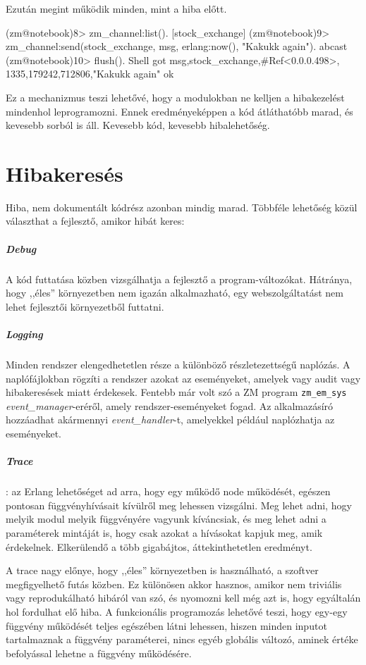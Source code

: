 \documentclass[12pt, a4paper, oneside]{book}
\begin{document}
Ezután megint működik minden, mint a hiba előtt.

\begin{code}{}{}
(zm@notebook)8> zm_channel:list().                                               
[stock_exchange]
(zm@notebook)9> zm_channel:send(stock_exchange, 
                    {msg, {erlang:now(), "Kakukk again"}}).
abcast
(zm@notebook)10> flush().                                                               
Shell got {msg,{stock_exchange,#Ref<0.0.0.498>},
               {{1335,179242,712806},"Kakukk again"}}
ok
\end{code}

Ez a mechanizmus teszi lehetővé, hogy a modulokban ne kelljen a
hibakezelést mindenhol leprogramozni. Ennek eredményeképpen a kód átláthatóbb
marad, és kevesebb sorból is áll. Kevesebb kód, kevesebb hibalehetőség. 

\section{Hibakeresés}
Hiba, nem dokumentált kódrész azonban mindig marad. Többféle lehetőség közül
választhat a fejlesztő, amikor hibát keres: 
\subparagraph{Debug} A kód futtatása közben vizsgálhatja a fejlesztő a
program-változókat. Hátránya, hogy ,,éles'' környezetben nem igazán
alkalmazható, egy webszolgáltatást nem lehet fejlesztői környezetből futtatni.
\subparagraph{Logging} Minden rendszer elengedhetetlen része a különböző
részletezettségű naplózás. A naplófájlokban rögzíti a rendszer azokat az
eseményeket, amelyek vagy audit vagy hibakeresések miatt érdekesek. Fentebb már
volt szó a ZM program \texttt{zm\_em\_sys} \emph{event\_manager}-eréről, amely
rendszer-eseményeket fogad. Az alkalmazásíró hozzáadhat akármennyi
\emph{event\_handler}-t, amelyekkel például naplózhatja az eseményeket.
\subparagraph{Trace}: az Erlang lehetőséget ad arra, hogy egy működő node
működését, egészen pontosan függvényhívásait kívülről meg lehessen vizsgálni.
Meg lehet adni, hogy melyik modul melyik függvényére vagyunk kíváncsiak, és meg
lehet adni a paraméterek mintáját is, hogy csak azokat a hívásokat kapjuk meg,
amik érdekelnek. Elkerülendő a több gigabájtos, áttekinthetetlen eredményt. 

A trace nagy előnye, hogy ,,éles'' környezetben is használható, a szoftver
megfigyelhető futás közben. Ez különösen akkor hasznos, amikor nem triviális
vagy reprodukálható hibáról van szó, és nyomozni kell még azt is, hogy
egyáltalán hol fordulhat elő hiba. A funkcionális programozás lehetővé teszi,
hogy egy-egy függvény működését teljes egészében látni lehessen, hiszen minden
inputot tartalmaznak a függvény paraméterei, nincs egyéb globális változó,
aminek értéke befolyással lehetne a függvény működésére.
\end{document}

